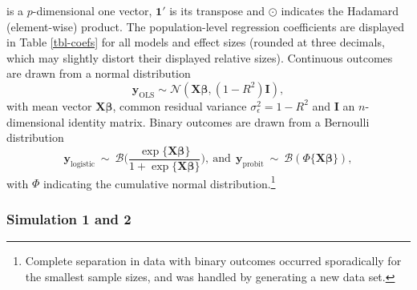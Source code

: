 \documentclass[
]{interact}
\begin{document}
is a \(p\)-dimensional one vector, \(\boldsymbol{1'}\) is its transpose
and \(\odot\) indicates the Hadamard (element-wise) product. The
population-level regression coefficients are displayed in Table
\ref{tbl-coefs} for all models and effect sizes (rounded at three
decimals, which may slightly distort their displayed relative sizes).
Continuous outcomes are drawn from a normal distribution \[
\boldsymbol{y}_{\text{OLS}} \sim \mathcal{N}(\boldsymbol{X\beta}, (1 - R^2)\boldsymbol{I}),
\] with mean vector \(\boldsymbol{X\beta}\), common residual variance
\(\sigma_{\epsilon}^2=1-R^2\) and \(\boldsymbol{I}\) an
\(n\)-dimensional identity matrix. Binary outcomes are drawn from a
Bernoulli distribution \[
\boldsymbol{y}_{\text{logistic}} ~ \sim ~ \mathcal{B}\Big(\frac{\exp\{\boldsymbol{X\beta}\}}{1 + \exp\{\boldsymbol{X\beta}\}}\Big), 
~ \text{and} ~~
\boldsymbol{y}_{\text{probit}} ~ \sim ~ \mathcal{B}(\Phi\{\boldsymbol{X\beta}\}),
\] with \(\Phi\) indicating the cumulative normal
distribution.\footnote{Complete separation in data with binary outcomes
  occurred sporadically for the smallest sample sizes, and was handled
  by generating a new data set.}

\begin{table}[t]
\centering
\caption{Population-level regression coefficients for ordinary least squares (OLS), logistic and probit regression, given effect sizes of $R^2 \in \{0.02, 0.09, 0.25\}$.} 
\label{tbl-coefs}
\end{table}

\hypertarget{simulation-1-and-2}{%
\subsubsection{Simulation 1 and 2}\label{simulation-1-and-2}}
\end{document}
